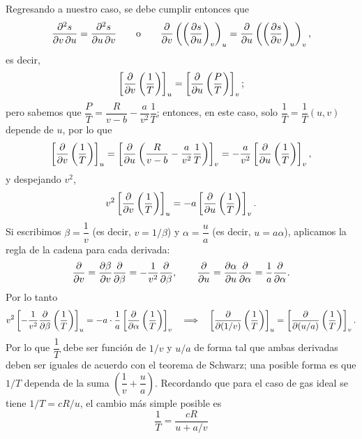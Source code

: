 Regresando a nuestro caso, se debe cumplir entonces que
\begin{equation*}
  \frac{\partial^{2}s}{\partial v\,\partial u}=\frac{\partial^{2}s}{\partial u\,\partial v}
  \qquad\text{o}\qquad
  \pdv{v}\left(\left(\frac{\partial s}{\partial u}\right)_{v}\right)_{u}=\pdv{u}\left(\left(\frac{\partial s}{\partial v}\right)_{u}\right)_{v},
\end{equation*}
es decir,
\begin{equation*}
  \left[\pdv{v}\left(\frac{1}{T}\right)\right]_{u}=\left[\pdv{u}\left(\frac{P}{T}\right)\right]_{v};
\end{equation*}
pero sabemos que $\dfrac{P}{T}=\dfrac{R}{v-b}-\dfrac{a}{v^{2}}\dfrac{1}{T}$; entonces, en este caso,
solo $\dfrac{1}{T}=\dfrac{1}{T}(u,v)$ depende de $u$, por lo que
\begin{equation*}
  \left[\pdv{v}\left(\frac{1}{T}\right)\right]_{u}=\left[\pdv{u}\left(\frac{R}{v-b}-\frac{a}{v^{2}}\frac{1}{T}\right)\right]_{v}
  =-\frac{a}{v^{2}}\left[\pdv{u}\left(\frac{1}{T}\right)\right]_{v},
\end{equation*}
y despejando $v^{2}$,
\begin{equation*}
  v^{2}\left[\pdv{v}\left(\frac{1}{T}\right)\right]_{u}=-a\left[\pdv{u}\left(\frac{1}{T}\right)\right]_{v}.
\end{equation*}
Si escribimos $\beta=\dfrac{1}{v}$ (es decir, $v=1/\beta$) y $\alpha=\dfrac{u}{a}$ (es decir,
$u=a\alpha$), aplicamos la regla de la cadena para cada derivada:
\begin{equation*}
  \pdv{v}=\pdv{\beta}{v}\pdv{\beta}=-\frac{1}{v^{2}}\pdv{\beta},
  \qquad
  \pdv{u}=\pdv{\alpha}{u}\pdv{\alpha}=\frac{1}{a}\pdv{\alpha}.
\end{equation*}
Por lo tanto
\begin{equation*}
  v^{2}\left[-\frac{1}{v^{2}}\pdv{\beta}\left(\frac{1}{T}\right)\right]_{u}=-a\cdot\frac{1}{a}\left[\pdv{\alpha}\left(\frac{1}{T}\right)\right]_{v}
  \quad\Longrightarrow\quad
  \left[\pdv{(1/v)}\left(\frac{1}{T}\right)\right]_{u}=\left[\pdv{(u/a)}\left(\frac{1}{T}\right)\right]_{v}.
\end{equation*}
Por lo que $\dfrac{1}{T}$ debe ser función de $1/v$ y $u/a$ de forma tal que ambas derivadas deben
ser iguales de acuerdo con el teorema de Schwarz; una posible forma es que $1/T$ dependa de la suma
$\left(\dfrac{1}{v}+\dfrac{u}{a}\right)$. Recordando que para el caso de gas ideal se tiene
$1/T=cR/u$, el cambio más simple posible es
\begin{equation*}
  \boxed{\frac{1}{T}=\frac{cR}{u+a/v}}
\end{equation*}

